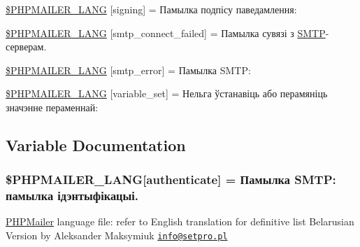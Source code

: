 \begin{DoxyCompactItemize}
\item 
\hyperlink{phpmailer_8lang-be_8php_a68e437bdb9b968a5a67320f03d231565}{\$\+P\+H\+P\+M\+A\+I\+L\+E\+R\+\_\+\+L\+A\+NG} \mbox{[}\textquotesingle{}signing\textquotesingle{}\mbox{]} = \textquotesingle{}Памылка подпісу паведамлення\+: \textquotesingle{}
\item 
\hyperlink{phpmailer_8lang-be_8php_a7b321d4ca1e9df702403ed4c61aa0980}{\$\+P\+H\+P\+M\+A\+I\+L\+E\+R\+\_\+\+L\+A\+NG} \mbox{[}\textquotesingle{}smtp\+\_\+connect\+\_\+failed\textquotesingle{}\mbox{]} = \textquotesingle{}Памылка сувязі з \hyperlink{class_s_m_t_p}{S\+M\+TP}-\/серверам.\textquotesingle{}
\item 
\hyperlink{phpmailer_8lang-be_8php_a7d9cffba1e669c845f8a4c891ee50064}{\$\+P\+H\+P\+M\+A\+I\+L\+E\+R\+\_\+\+L\+A\+NG} \mbox{[}\textquotesingle{}smtp\+\_\+error\textquotesingle{}\mbox{]} = \textquotesingle{}Памылка S\+M\+T\+P\+: \textquotesingle{}
\item 
\hyperlink{phpmailer_8lang-be_8php_af795debc7a739d038742691c358d9032}{\$\+P\+H\+P\+M\+A\+I\+L\+E\+R\+\_\+\+L\+A\+NG} \mbox{[}\textquotesingle{}variable\+\_\+set\textquotesingle{}\mbox{]} = \textquotesingle{}Нельга ўстанавіць або перамяніць значэнне пераменнай\+: \textquotesingle{}
\end{DoxyCompactItemize}


\subsection{Variable Documentation}
\subsubsection[{\texorpdfstring{\$\+P\+H\+P\+M\+A\+I\+L\+E\+R\+\_\+\+L\+A\+NG}{$PHPMAILER_LANG}}]{\setlength{\rightskip}{0pt plus 5cm}\$P\+H\+P\+M\+A\+I\+L\+E\+R\+\_\+\+L\+A\+NG\mbox{[}\textquotesingle{}authenticate\textquotesingle{}\mbox{]} = \textquotesingle{}Памылка S\+M\+T\+P\+: памылка ідэнтыфікацыі.\textquotesingle{}}\hypertarget{phpmailer_8lang-be_8php_a2cb33073c989b85580748e331ed8b4aa}{}\label{phpmailer_8lang-be_8php_a2cb33073c989b85580748e331ed8b4aa}
\hyperlink{class_p_h_p_mailer}{P\+H\+P\+Mailer} language file\+: refer to English translation for definitive list Belarusian Version by Aleksander Maksymiuk \href{mailto:info@setpro.pl}{\tt info@setpro.\+pl} 

